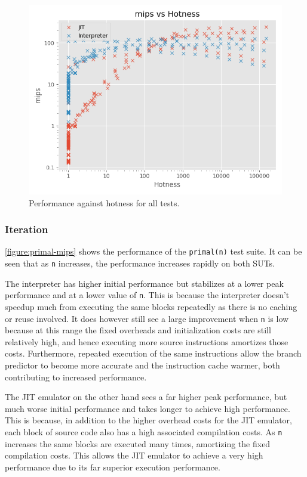 \begin{figure}
    \centering
    \includegraphics{output/graphs/scatter/hotness.png}
    \caption{Performance against hotness for all tests.}
    \label{figure:hotness}
\end{figure}

\subsubsection{Iteration}

\autoref{figure:primal-mips} shows the performance of the \texttt{primal(n)} test suite. It can be seen that as \texttt{n} increases, the performance increases rapidly on both SUTs.

The interpreter has higher initial performance but stabilizes at a lower peak performance and at a lower value of \texttt{n}. This is because the interpreter doesn't speedup much from executing the same blocks repeatedly as there is no caching or reuse involved. It does however still see a large improvement when \texttt{n} is low because at this range the fixed overheads and initialization costs are still relatively high, and hence executing more source instructions amortizes those costs. Furthermore, repeated execution of the same instructions allow the branch predictor to become more accurate and the instruction cache warmer, both contributing to increased performance.

The JIT emulator on the other hand sees a far higher peak performance, but much worse initial performance and takes longer to achieve high performance. This is because, in addition to the higher overhead costs for the JIT emulator, each block of source code also has a high associated compilation costs. As \texttt{n} increases the same blocks are executed many times, amortizing the fixed compilation costs. This allows the JIT emulator to achieve a very high performance due to its far superior execution performance.

